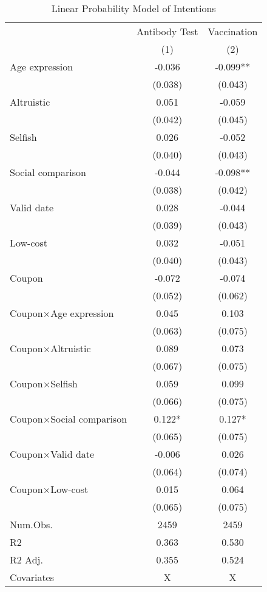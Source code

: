 \documentclass[
  11pt,
  a4paper,
]{article}
\begin{document}
\begin{table}
\caption{\label{tab:int-reg}Linear Probability Model of Intentions}
\centering
\begin{tabular}[t]{lcc}
\toprule
\multicolumn{1}{c}{ } & \multicolumn{1}{c}{Antibody Test} & \multicolumn{1}{c}{Vaccination} \\
\cmidrule(l{3pt}r{3pt}){2-2} \cmidrule(l{3pt}r{3pt}){3-3}
  & (1) & (2)\\
\midrule
Age expression & -0.036 & -0.099**\\
 & (0.038) & (0.043)\\
Altruistic & 0.051 & -0.059\\
 & (0.042) & (0.045)\\
Selfish & 0.026 & -0.052\\
 & (0.040) & \vphantom{1} (0.043)\\
Social comparison & -0.044 & -0.098**\\
 & (0.038) & (0.042)\\
Valid date & 0.028 & -0.044\\
 & (0.039) & (0.043)\\
Low-cost & 0.032 & -0.051\\
 & (0.040) & (0.043)\\
Coupon & -0.072 & -0.074\\
 & (0.052) & (0.062)\\
Coupon×Age expression & 0.045 & 0.103\\
 & (0.063) & (0.075)\\
Coupon×Altruistic & 0.089 & 0.073\\
 & (0.067) & (0.075)\\
Coupon×Selfish & 0.059 & 0.099\\
 & (0.066) & (0.075)\\
Coupon×Social comparison & 0.122* & 0.127*\\
 & (0.065) & \vphantom{1} (0.075)\\
Coupon×Valid date & -0.006 & 0.026\\
 & (0.064) & (0.074)\\
Coupon×Low-cost & 0.015 & 0.064\\
 & (0.065) & (0.075)\\
\midrule
Num.Obs. & 2459 & 2459\\
R2 & 0.363 & 0.530\\
R2 Adj. & 0.355 & 0.524\\
Covariates & X & X\\
\bottomrule
\end{tabular}
\end{table}
\end{document}
